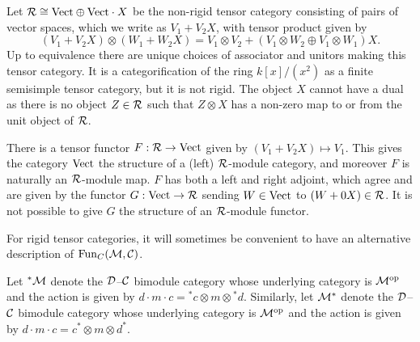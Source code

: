 \documentclass{amsart}
\begin{document}
\begin{example} \label{ex:lax-module}

	Let $\mathcal R \cong \mathrm{Vect} \oplus \mathrm{Vect} \cdot X$ be the non-rigid tensor category consisting of pairs of vector spaces, which we write as $V_1 + V_2 X$, with tensor product given by 
	\begin{equation*}
		(V_1 + V_2 X) \otimes (W_1 + W_2 X) = V_1 \otimes V_2  +  (V_1 \otimes W_2 \oplus V_1 \otimes W_1)X.
	\end{equation*} 
	Up to equivalence there are unique choices of associator and unitors making this tensor category. It is a categorification of the ring $k[x]/(x^2)$ as a finite semisimple tensor category, but it is not rigid. The object $X$ cannot have a dual as there is no object $Z \in \mathcal R$ such that $Z \otimes X$ has a non-zero map to or from the unit object of $\mathcal R$. 
	
	There is a tensor functor $F:\mathcal R \to \mathrm{Vect}$ given by $(V_1 + V_2 X) \mapsto V_1$. This gives the category $\mathrm{Vect}$ the structure of a (left) $\mathcal R$-module category, and moreover $F$ is naturally an $\mathcal R$-module map. $F$ has both a left and right adjoint, which agree and are given by the functor $G: \mathrm{Vect} \to \mathcal R$ sending $W \in \mathrm{Vect}$ to $(W + 0 X) \in \mathcal R$. It is not possible to give $G$ the structure of an $\mathcal R$-module functor. 
\end{example}


For rigid tensor categories, it will sometimes be convenient to have an alternative description of $\operatorname{Fun}_C(\mathcal M,\mathcal C)$.

\begin{definition}
Let ${}^*\mathcal M$ denote the $\mathcal D$--$\mathcal C$ bimodule category whose underlying category is $\mathcal M^{\mathrm{op}}$ and the action is given by $d\cdot m \cdot c = {}^*c \otimes m \otimes {}^*d$.  Similarly, let $\mathcal M^*$ denote the $\mathcal D$--$\mathcal C$ bimodule category whose underlying category is $\mathcal M^{\mathrm{op}}$ and the action is given by $d\cdot m \cdot c = c^* \otimes m \otimes d^*$.  
\end{definition}
\end{document}
